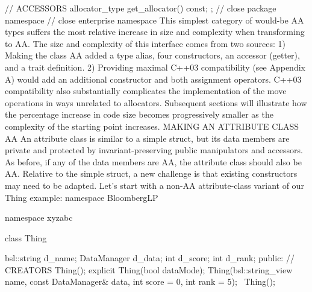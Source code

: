 {{{{{    // ACCESSORS
    allocator_type get_allocator() const;
};
} // close package namespace
} // close enterprise namespace
This simplest category of would-be AA types suffers the most relative increase in size and complexity when transforming to AA.  The size and complexity of this interface comes from two sources:
1)	Making the class AA added a type alias, four constructors, an accessor (getter), and a trait definition.
2)	Providing maximal C++03 compatibility (see Appendix A) would add an additional constructor and both assignment operators. C++03 compatibility also substantially complicates the implementation of the move operations in ways unrelated to allocators.
Subsequent sections will illustrate how the percentage increase in code size becomes progressively smaller as the complexity of the starting point increases.
MAKING AN ATTRIBUTE CLASS AA
An attribute class is similar to a simple struct, but its data members are private and protected by invariant-preserving public manipulators and accessors. As before, if any of the data members are AA, the attribute class should also be AA. Relative to the simple struct, a new challenge is that existing constructors may need to be adapted.
Let’s start with a non-AA attribute-class variant of our Thing example:
namespace BloombergLP {
namespace xyzabc {
class Thing {
    bsl::string d_name;
    DataManager d_data;
    int         d_score;
    int         d_rank;
  public:
    // CREATORS
    Thing();
    explicit Thing(bool dataMode);
    Thing(bsl::string_view   name,
          const DataManager& data,
          int                score = 0,
          int                rank  = 5);
    ~Thing();

}}}}}
